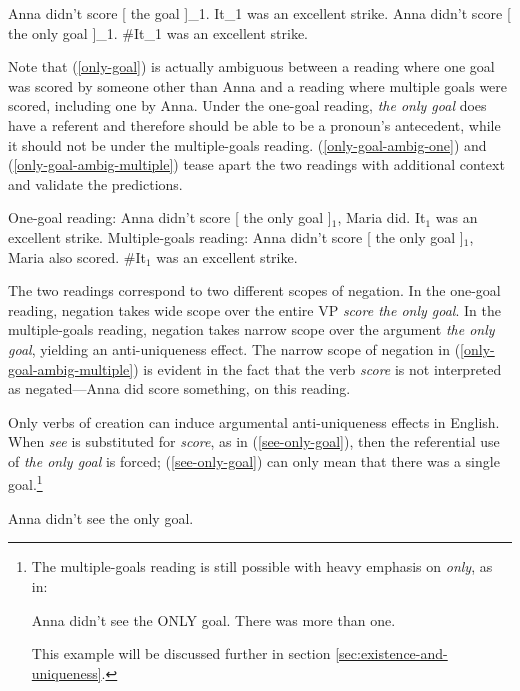 \begin{exe}
	\ex \label{the-goal} Anna didn't score [ the goal ]_1. It_1 was an excellent strike.
	\ex \label{only-goal-multiple} Anna didn't score [ the only goal ]_1. \#It_1 was an excellent strike.
\end{exe}

Note that (\ref{only-goal}) is actually ambiguous between a reading where one goal was scored by someone other than Anna and a reading where multiple goals were scored, including one by Anna. Under the one-goal reading, \textit{the only goal} does have a referent and therefore should be able to be a pronoun's antecedent, while it should not be under the multiple-goals reading. (\ref{only-goal-ambig-one}) and (\ref{only-goal-ambig-multiple}) tease apart the two readings with additional context and validate the predictions.

\begin{exe}
	\ex \label{only-goal-ambig-one} One-goal reading: Anna didn't score [ the only goal ]$_1$, Maria did. It$_1$ was an excellent strike.
	\ex \label{only-goal-ambig-multiple} Multiple-goals reading: Anna didn't score [ the only goal ]$_1$, Maria also scored. \#It$_1$ was an excellent strike.
\end{exe}

The two readings correspond to two different scopes of negation. In the one-goal reading, negation takes wide scope over the entire VP \textit{score the only goal}. In the multiple-goals reading, negation takes narrow scope over the argument \textit{the only goal}, yielding an anti-uniqueness effect. The narrow scope of negation in (\ref{only-goal-ambig-multiple}) is evident in the fact that the verb \textit{score} is not interpreted as negated---Anna did score something, on this reading.

Only verbs of creation can induce argumental anti-uniqueness effects in English. When \textit{see} is substituted for \textit{score}, as in (\ref{see-only-goal}), then the referential use of \textit{the only goal} is forced; (\ref{see-only-goal}) can only mean that there was a single goal.\footnote{The multiple-goals reading is still possible with heavy emphasis on \textit{only}, as in: \begin{exe} \ex Anna didn't see the ONLY goal. There was more than one. \end{exe} This example will be discussed further in section \ref{sec:existence-and-uniqueness}.}

\begin{exe}
	\ex \label{see-only-goal} Anna didn't see the only goal.
\end{exe}
